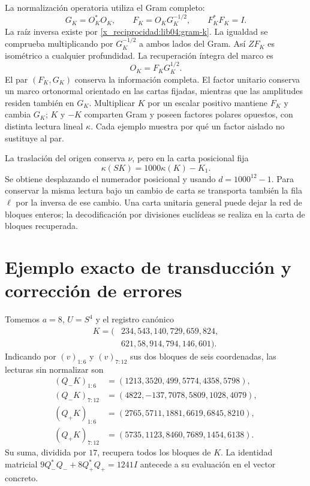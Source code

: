 La normalización operatoria utiliza el Gram completo:
\begin{equation}
 G_K=O_K^*O_K,\qquad
 F_K=O_KG_K^{-1/2},\qquad
 F_K^*F_K=I.
 \label{x_reciprocidad:lib04:polar}
\end{equation}
La raíz inversa existe por \eqref{x_reciprocidad:lib04:gram-k}. La igualdad se
comprueba multiplicando por \(G_K^{-1/2}\) a ambos lados del Gram.
Así \(ZF_K\) es isométrico a cualquier profundidad.
La recuperación íntegra del marco es
\begin{equation}
 O_K=F_KG_K^{1/2}.
 \label{x_reciprocidad:lib04:polar-inversa}
\end{equation}
El par \((F_K,G_K)\) conserva la información completa.
El factor unitario conserva un marco ortonormal orientado en las
cartas fijadas, mientras que las amplitudes residen también en
\(G_K\). Multiplicar \(K\) por un escalar positivo mantiene
\(F_K\) y cambia \(G_K\); \(K\) y \(-K\) comparten
Gram y poseen factores polares opuestos, con distinta lectura lineal
\(\kappa\). Cada ejemplo muestra por qué un factor aislado no
sustituye al par.

La traslación del origen conserva \(\nu\), pero en la carta
posicional fija
\begin{equation}
 \kappa(SK)=1000\kappa(K)-K_1.
 \label{x_reciprocidad:lib04:cambio-origen}
\end{equation}
Se obtiene desplazando el numerador posicional y usando
\(d=1000^{12}-1\). Para conservar la misma lectura bajo un cambio
de carta se transporta también la fila \(\ell\) por la inversa
de ese cambio. Una carta unitaria general puede dejar la red de
bloques enteros; la decodificación por divisiones euclídeas se realiza
en la carta de bloques recuperada.

\section{Ejemplo exacto de transducción y corrección de errores}
\label{x_reciprocidad:lib04:ejemplo}

Tomemos \(a=8\), \(U=S^4\) y el registro canónico
\begin{equation}
 \begin{split}
 K=(&234,543,140,729,659,824,\\
    &621,58,914,794,146,601).
 \end{split}
 \label{x_reciprocidad:lib04:k-ejemplo}
\end{equation}
Indicando por \((v)_{1:6}\) y \((v)_{7:12}\) sus dos bloques de
seis coordenadas, las lecturas sin normalizar son
\begin{align}
 (Q_-K)_{1:6}&=(1213,3520,499,5774,4358,5798),\nonumber\\
 (Q_-K)_{7:12}&=(4822,-137,7078,5809,1028,4079),\nonumber\\
 (Q_+K)_{1:6}&=(2765,5711,1881,6619,6845,8210),\nonumber\\
 (Q_+K)_{7:12}&=(5735,1123,8460,7689,1454,6138).
 \label{x_reciprocidad:lib04:canales-ejemplo}
\end{align}
Su suma, dividida por \(17\), recupera todos los bloques de \(K\).
La identidad matricial
\(9Q_-^*Q_-+8Q_+^*Q_+=1241I\) antecede a su evaluación en el
vector concreto.

